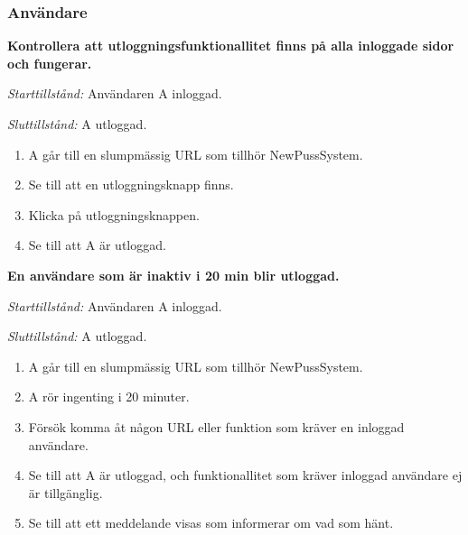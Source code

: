 \documentclass[a4paper]{article}
\begin{document}
\subsubsection{Användare}
\begin{FT}
\item
\textbf{Kontrollera att utloggningsfunktionallitet finns på alla inloggade sidor och fungerar.}

\emph{Starttillstånd:} Användaren A inloggad.

\emph{Sluttillstånd:} A utloggad.

\begin{enumerate}
\item A går till en slumpmässig URL som tillhör NewPussSystem.
\item Se till att en utloggningsknapp finns.
\item Klicka på utloggningsknappen.
\item Se till att A är utloggad.
\end{enumerate}

\item
\textbf{En användare som är inaktiv i 20 min blir utloggad.}

\emph{Starttillstånd:} Användaren A inloggad.

\emph{Sluttillstånd:} A utloggad.

\begin{enumerate}
\item A går till en slumpmässig URL som tillhör NewPussSystem.
\item A rör ingenting i 20 minuter.
\item Försök komma åt någon URL eller funktion som kräver en inloggad användare.
\item Se till att A är utloggad, och funktionallitet som kräver inloggad användare ej är tillgänglig.
\item Se till att ett meddelande visas som informerar om vad som hänt.
\end{enumerate}
\end{FT}
\end{document}
